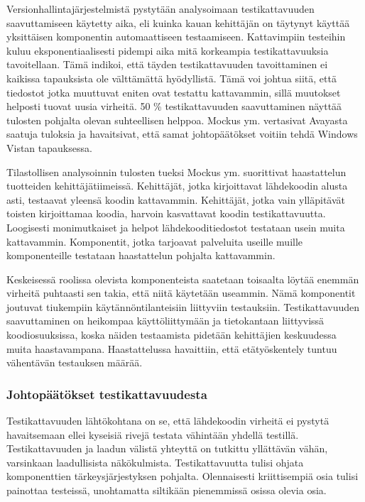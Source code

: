 \documentclass[finnish]{../tktltiki2}
\theoremstyle{definition}
\theoremstyle{remark}
\begin{document}
    Versionhallintajärjestelmistä pystytään analysoimaan testikattavuuden saavuttamiseen käytetty aika, eli kuinka kauan 
kehittäjän on täytynyt käyttää yksittäisen komponentin automaattiseen testaamiseen. Kattavimpiin testeihin kuluu 
eksponentiaalisesti pidempi aika mitä korkeampia testikattavuuksia tavoitellaan. Tämä indikoi, että täyden 
testikattavuuden tavoittaminen ei kaikissa tapauksista ole välttämättä hyödyllistä. Tämä voi johtua siitä, että 
tiedostot jotka muuttuvat eniten ovat testattu kattavammin, sillä muutokset helposti tuovat uusia virheitä. 50 \% 
testikattavuuden saavuttaminen näyttää tulosten pohjalta olevan suhteellisen helppoa. Mockus ym. vertasivat Avayasta 
saatuja tuloksia ja havaitsivat, että samat johtopäätökset voitiin tehdä Windows Vistan tapauksessa.

    Tilastollisen analysoinnin tulosten tueksi Mockus ym. suorittivat haastattelun tuotteiden kehittäjätiimeissä. 
Kehittäjät, jotka kirjoittavat lähdekoodin alusta asti, testaavat yleensä koodin kattavammin. Kehittäjät, jotka vain 
ylläpitävät toisten kirjoittamaa koodia, harvoin kasvattavat koodin testikattavuutta. Loogisesti monimutkaiset 
ja helpot lähdekooditiedostot testataan usein muita kattavammin. Komponentit, jotka tarjoavat palveluita useille muille 
komponenteille testataan haastattelun pohjalta kattavammin.

    Keskeisessä roolissa olevista komponenteista saatetaan toisaalta löytää enemmän virheitä puhtaasti sen takia, että 
niitä käytetään useammin. Nämä komponentit joutuvat tiukempiin käytännöntilanteisiin liittyviin testauksiin. 
Testikattavuuden saavuttaminen on heikompaa käyttöliittymään ja tietokantaan liittyvissä koodiosuuksissa, koska näiden 
testaamista pidetään kehittäjien keskuudessa muita haastavampana. Haastattelussa havaittiin, että etätyöskentely tuntuu 
vähentävän testauksen määrää.

\subsubsection{Johtopäätökset testikattavuudesta}

Testikattavuuden lähtökohtana on se, että lähdekoodin virheitä ei pystytä havaitsemaan ellei kyseisiä rivejä testata 
vähintään yhdellä testillä. Testikattavuuden ja laadun välistä yhteyttä on tutkittu yllättävän vähän, varsinkaan 
laadullisista näkökulmista. Testikattavuutta tulisi ohjata komponenttien tärkeysjärjestyksen pohjalta. Olennaisesti 
kriittisempiä osia tulisi painottaa testeissä, unohtamatta siltikään pienemmissä osissa olevia osia.
\end{document}
